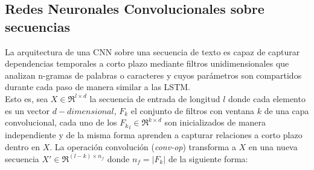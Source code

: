  
\subsection{Redes Neuronales Convolucionales sobre secuencias}
	
	La arquitectura de una CNN \citep{lecun1998gradient} sobre una secuencia de texto es capaz de capturar dependencias temporales a corto plazo mediante filtros unidimensionales que analizan n-gramas de palabras o caracteres y cuyos parámetros son compartidos durante cada paso de manera similar a las LSTM.
	\\
	Esto es, sea $X \in \Re^{l\times d}$ la secuencia de entrada de longitud $l$ donde cada elemento es un vector $d-dimensional$, $F_k$ el conjunto de filtros con ventana $k$ de una capa convolucional, cada uno de los ${F_k}_i \in \Re^{k\times d}$ son inicializados de manera independiente y de la misma forma aprenden a capturar relaciones a corto plazo  dentro en $X$. La operación convolución (\textit{conv-op}) transforma a $X$ en una nueva secuencia $X' \in \Re^{(l - k) \times n_f}$ donde $n_f = |F_k|$ de la siguiente forma:
	
